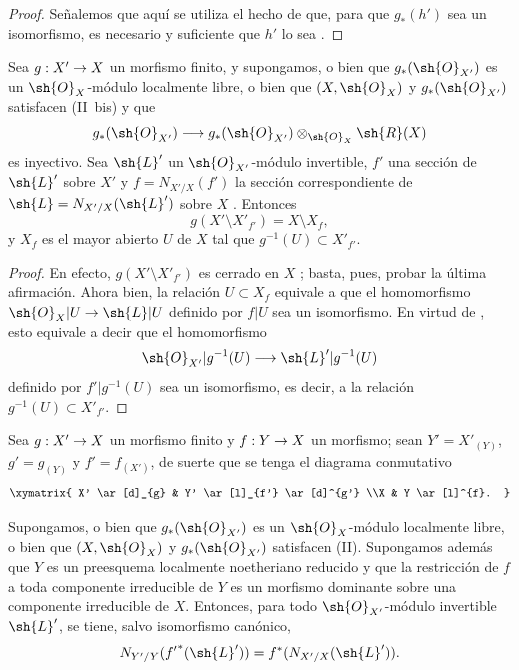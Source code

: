 \documentclass[oneside,10pt]{amsart}
\makeatletter
\newcommand{\ega@arrow}[2]{\mathchoice{#1}{#2}{#2}{#2}}
\renewcommand{\to}{\ega@arrow{\longrightarrow}{\rightarrow}}
\newcommand{\oldpage}[2][]{\marginnote{\normalfont\footnotesize\textbf{#1}~|~#2}\ignorespaces}
\let\EGAOriginalLabel\label
\renewcommand{\label}[1]{\phantomsection\EGAOriginalLabel{#1}}
\makeatother
\begin{document}
\begin{proof}
Señalemos que aquí se utiliza el hecho de que, para que $g_*(h')$ sea un isomorfismo, es necesario y suficiente que $h'$ lo sea .
\end{proof}

\begin{corollary}[6.5.7]
\label{II.6.5.7}
Sea $g:X'\to X$ un morfismo finito, y supongamos, o bien que $g_*(\sh{O}_{X'})$ es un $\sh{O}_X$-módulo localmente libre, o bien que $(X,\sh{O}_X)$ y $g_*(\sh{O}_{X'})$ satisfacen \textup{(II~bis)} y que
\[
  g_*(\sh{O}_{X'})\to
  g_*(\sh{O}_{X'})\otimes_{\sh{O}_X}\sh{R}(X)
\]
es inyectivo.
Sea $\sh{L}'$ un $\sh{O}_{X'}$-módulo invertible, $f'$ una sección de $\sh{L}'$ sobre $X'$ y $f=N_{X'/X}(f')$ la sección correspondiente de $\sh{L}=N_{X'/X}(\sh{L}')$ sobre $X$ .
\oldpage[II]{130}
Entonces
\[
  g(X'\setminus X'_{f'})=X\setminus X_f,
\]
y $X_f$ es el mayor abierto $U$ de $X$ tal que $g^{-1}(U)\subset X'_{f'}$.
\end{corollary}

\begin{proof}
En efecto, $g(X'\setminus X'_{f'})$ es cerrado en $X$ ;
basta, pues, probar la última afirmación.
Ahora bien, la relación $U\subset X_f$ equivale a que el homomorfismo $\sh{O}_X|U\to\sh{L}|U$ definido por $f|U$ sea un isomorfismo.
En virtud de , esto equivale a decir que el homomorfismo
\[
  \sh{O}_{X'}|g^{-1}(U)\to\sh{L}'|g^{-1}(U)
\]
definido por $f'|g^{-1}(U)$ sea un isomorfismo, es decir, a la relación $g^{-1}(U)\subset X'_{f'}$.
\end{proof}


\begin{proposition}[6.5.8]
\label{II.6.5.8}
Sea $g:X'\to X$ un morfismo finito y $f:Y\to X$ un morfismo;
sean $Y'=X'_{(Y)}$, $g'=g_{(Y)}$ y $f'=f_{(X')}$, de suerte que se tenga el diagrama conmutativo
\[
  \xymatrix{
    X' \ar[d]_{g}
    & Y' \ar[l]_{f'} \ar[d]^{g'}
  \\X
    & Y \ar[l]^{f}.
  }
\]

Supongamos, o bien que $g_*(\sh{O}_{X'})$ es un $\sh{O}_X$-módulo localmente libre, o bien que $(X,\sh{O}_X)$ y $g_*(\sh{O}_{X'})$ satisfacen \textup{(II)}.
Supongamos además que $Y$ es un preesquema localmente noetheriano reducido y que la restricción de $f$ a toda componente irreducible de $Y$ es un morfismo dominante sobre una componente irreducible de $X$.
Entonces, para todo $\sh{O}_{X'}$-módulo invertible $\sh{L}'$, se tiene, salvo isomorfismo canónico,
\[
  N_{Y'/Y}({f'}^*(\sh{L}'))=
  f^*(N_{X'/X}(\sh{L}')).
\]
\end{proposition}
\end{document}
